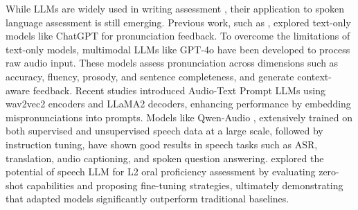 \documentclass{Interspeech}
\begin{document}
While LLMs are widely used in writing assessment \cite{mizumoto2023exploring, yancey2023rating}, their application to spoken language assessment is still emerging. Previous work, such as \cite{wang2025exploring}, explored text-only models like ChatGPT for pronunciation feedback. %
To overcome the limitations of text-only models, multimodal LLMs like GPT-4o \cite{hurst2024gpt} have been developed to process raw audio input. These models assess pronunciation across dimensions such as accuracy, fluency, prosody, and sentence completeness, and generate context-aware feedback. Recent studies \cite{wu2024prompting, wu2025integrating} introduced Audio-Text Prompt LLMs using wav2vec2 encoders and LLaMA2 decoders, enhancing performance by embedding mispronunciations into prompts. Models like Qwen-Audio \cite{chu2023qwen, chu2024qwen2}, extensively trained on both supervised and unsupervised speech data at a large scale, followed by instruction tuning, have shown good results in speech tasks such as ASR, translation, audio captioning, and spoken question answering. \cite{ma2025assessment} explored the potential of speech LLM for L2 oral proficiency assessment by evaluating zero-shot capabilities and proposing fine-tuning strategies, ultimately demonstrating that adapted models significantly outperform traditional baselines.
\end{document}
